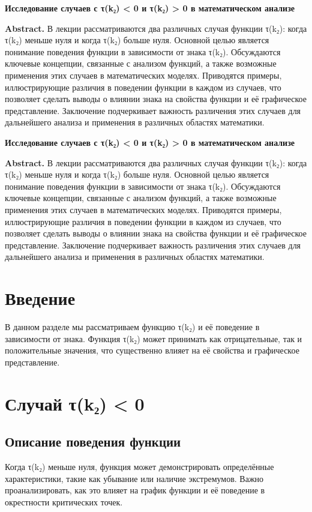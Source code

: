 \documentclass[a4paper]{article}
\begin{document}
\begin{center}
{\LARGE \textbf{Исследование случаев с τ(k₂) < 0 и τ(k₂) > 0 в математическом анализе}}\\[1em]
\end{center}

\textbf{Abstract.} В лекции рассматриваются два различных случая функции τ(k₂): когда τ(k₂) меньше нуля и когда τ(k₂) больше нуля. Основной целью является понимание поведения функции в зависимости от знака τ(k₂). Обсуждаются ключевые концепции, связанные с анализом функций, а также возможные применения этих случаев в математических моделях. Приводятся примеры, иллюстрирующие различия в поведении функции в каждом из случаев, что позволяет сделать выводы о влиянии знака на свойства функции и её графическое представление. Заключение подчеркивает важность различения этих случаев для дальнейшего анализа и применения в различных областях математики.

\begin{center}
{\LARGE \textbf{Исследование случаев с τ(k₂) < 0 и τ(k₂) > 0 в математическом анализе}}\\[1em]
\end{center}

\textbf{Abstract.} В лекции рассматриваются два различных случая функции τ(k₂): когда τ(k₂) меньше нуля и когда τ(k₂) больше нуля. Основной целью является понимание поведения функции в зависимости от знака τ(k₂). Обсуждаются ключевые концепции, связанные с анализом функций, а также возможные применения этих случаев в математических моделях. Приводятся примеры, иллюстрирующие различия в поведении функции в каждом из случаев, что позволяет сделать выводы о влиянии знака на свойства функции и её графическое представление. Заключение подчеркивает важность различения этих случаев для дальнейшего анализа и применения в различных областях математики.

\section{Введение}
В данном разделе мы рассматриваем функцию τ(k₂) и её поведение в зависимости от знака. Функция τ(k₂) может принимать как отрицательные, так и положительные значения, что существенно влияет на её свойства и графическое представление.

\section{Случай τ(k₂) < 0}
\subsection{Описание поведения функции}
Когда τ(k₂) меньше нуля, функция может демонстрировать определённые характеристики, такие как убывание или наличие экстремумов. Важно проанализировать, как это влияет на график функции и её поведение в окрестности критических точек.
\end{document}
